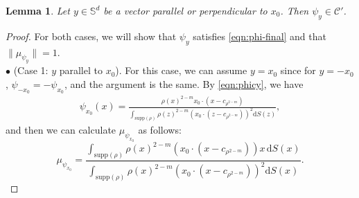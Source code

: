 \documentclass[11pt]{amsart}
\newtheorem{lemma}{Lemma}[section]
\newcommand{\bbs}{\mathbb S}
\newcommand{\dx}{\mathrm{d}S (x)}
\newcommand{\dz}{\mathrm{d}S (z)}
\newcommand{\supp}{\mathrm{supp}(\rho)}
\newcommand{\dm}{d} %
\begin{document}
\begin{lemma}\label{ppcp}
Let $y \in \bbs^\dm$ be a vector parallel or perpendicular to $x_0$. Then $\psi_y\in\mathcal{C}'$.
\end{lemma}
\begin{proof}
For both cases, we will show that $\psi_y$ satisfies \eqref{eqn:phi-final} and that $\|\mu_{\psi_y}\| =1$.\\

\noindent$\bullet$ (Case 1: $y$ parallel to $x_0$). For this case, we can assume $y=x_0$ since for $y=-x_0$, $\psi_{-x_0}=-\psi_{x_0}$, and the argument is the same. By \eqref{eqn:phicy}, we have
\begin{align}\label{eq:phix0}
\psi_{x_0}(x)=\frac{\rho(x)^{2-m}x_0\cdot(x-c_{\rho^{2-m}})}{\int_{\supp}\rho(z)^{2-m}\left(x_0\cdot (z-c_{\rho^{2-m}})\right)^2\dz},
\end{align}
and then we can calculate $\mu_{\psi_{x_0}}$ as follows:
\begin{equation}
\label{eqn:mu-phic}
\mu_{\psi_{x_0}}=\frac{\int_{\supp}\rho(x)^{2-m}\left(x_0\cdot(x-c_{\rho^{2-m}})\right) x\, \dx}{\int_{\supp}\rho(x)^{2-m}\left(x_0\cdot (x-c_{\rho^{2-m}})\right)^2\dx}.
\end{equation}


\end{proof}
\end{document}
